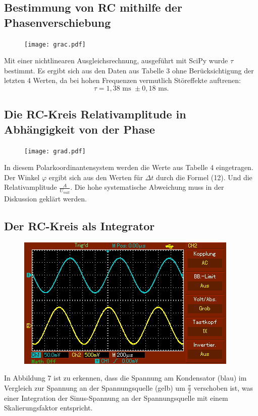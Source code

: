 \subsection{Bestimmung von RC mithilfe der Phasenverschiebung}
	 \begin{figure}[H]
	 	\centering
	 	\caption{}
	 	\texttt{[image: grac.pdf]}
	 	\label{fig:grac}
	 \end{figure}
	 
	 Mit einer nichtlinearen Ausgleichsrechnung, ausgeführt mit SciPy \cite{scipy} wurde $\tau$ bestimmt. Es ergibt sich aus den Daten aus Tabelle 3 ohne Berücksichtigung der letzten 4 Werten, da bei hohen Frequenzen vermutlich Störeffekte auftrenen:
	 \begin{displaymath}
	 \tau = 1,38  \text{ ms } \pm 0,18 \text{ ms.}
	 \end{displaymath}
	 

	 \subsection{Die RC-Kreis Relativamplitude in Abhängigkeit von der Phase}

	 \begin{figure}[H]
	  \centering
	  \caption{}
	  \texttt{[image: grad.pdf]}
	  \label{fig:grad}
	 \end{figure}
	 
	 In diesem Polarkoordinantensystem werden die Werte aus Tabelle 4 eingetragen. Der Winkel $\varphi$ ergibt sich aus den Werten für $\Delta t$ durch die Formel (12). Und die Relativamplitude $\frac{A}{U_{null}}$. Die hohe systematische Abweichung muss in der Diskussion geklärt werden.
	 
	 
	 
	 \subsection{Der RC-Kreis als Integrator}
	 \begin{figure}[H]
	 	\centering
	 	\caption{}
	 	\includegraphics[width=\linewidth-70pt,height=\textheight-70pt,keepaspectratio]{content/MAP002.png}
	 	\label{fig:Sinus}
	 \end{figure}
	 In Abbildung 7 ist zu erkennen, dass die Spannung am Kondensator (blau) im Vergleich zur Spannung an der Spannungsquelle (gelb) um $\frac{\pi}{2}$ verschoben ist, was einer Integration der Sinus-Spannung an der Spannungsquelle mit einem Skalierungsfaktor entspricht. 
	 

